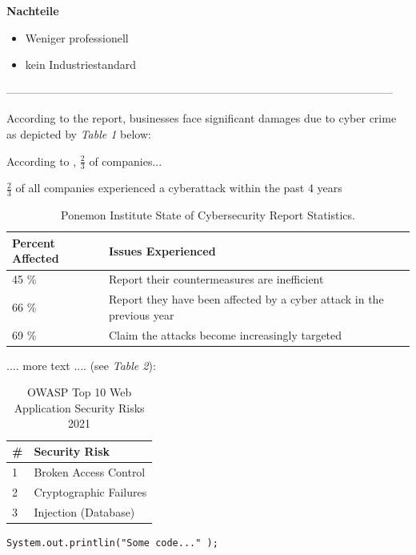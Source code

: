 \textbf{Nachteile}
\begin{itemize}
	\item Weniger professionell
	\item kein Industriestandard 
\end{itemize}
\cite{TinkercadReviews}



--------------------------------------------------------------------------------------------------------

According to the report, businesses face significant damages due to cyber crime as depicted by \emph{Table 1} below: 

According to \textcite{embroker}, $\frac{2}{3}$ of companies...

$\frac{2}{3}$ of all companies experienced a cyberattack within the past 4 years \parencite{embroker}

\begin{table} [H]
	\begin{tabular}{ |p{2cm}|p{11.0cm}| }
		\hline
		\textbf{Percent Affected}& \textbf{Issues Experienced}\\
		\hline
		45 \% & Report their countermeasures are inefficient  \\ 
		66 \% & Report they have been affected by a cyber attack in the previous year  \\  
		69 \% & Claim the attacks become increasingly targeted \\  
		\hline
	\end{tabular}
	\caption{\label{tab:CyberSecReport}Ponemon Institute State of Cybersecurity Report Statistics.}
\end{table}

.... more text ....  (see \emph{Table 2}):

\begin{table} [H]
	\begin{tabular}{ |p{2cm}| p{11.0cm}| }
		\hline
		\textbf{\#}& \textbf{Security Risk}\\
		\hline
		1 & Broken Access Control \\
		2 & Cryptographic Failures \\
		3 & Injection (Database) \\
		\hline
	\end{tabular}
	\caption{\label{tab:OWASP2021} OWASP Top 10 Web Application Security Risks 2021}
\end{table}

\begin{lstlisting}
System.out.printlin("Some code..." );
\end{lstlisting}



